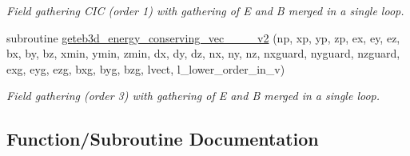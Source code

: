 \begin{DoxyCompactItemize}
\begin{DoxyCompactList}\small\item\em Field gathering C\+IC (order 1) with gathering of E and B merged in a single loop. \end{DoxyCompactList}\item 
subroutine \hyperlink{field__gathering__3d__o3_8_f90_a6e3a3b1519fdd7090c55244b49a8d80f}{geteb3d\+\_\+energy\+\_\+conserving\+\_\+vec\+\_\+\_\+\_\+\_\+v2} (np, xp, yp, zp, ex, ey, ez, bx, by, bz,                                                                                                                                                                       xmin, ymin, zmin,                                                                                                                                                                                               dx, dy, dz, nx, ny, nz, nxguard, nyguard, nzguard,                                                                                                                                                                       exg, eyg, ezg, bxg, byg, bzg, lvect, l\+\_\+lower\+\_\+order\+\_\+in\+\_\+v)
\begin{DoxyCompactList}\small\item\em Field gathering (order 3) with gathering of E and B merged in a single loop. \end{DoxyCompactList}\end{DoxyCompactItemize}


\subsection{Function/\+Subroutine Documentation}
